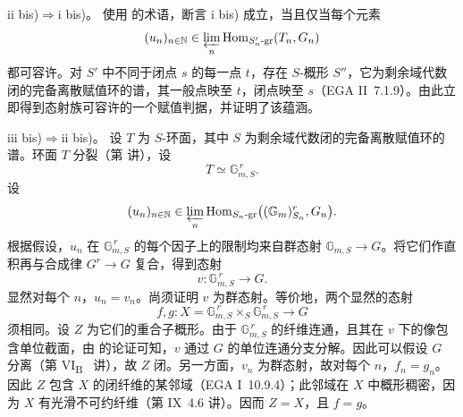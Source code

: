 \textup{ii bis)}\(\Rightarrow\)\textup{i bis)}。
使用  的术语，断言 \textup{i bis)} 成立，当且仅当每个元素
\[
 (u_n)_{n\in\mathbb N}\in
 \varprojlim_n\operatorname{Hom}_{S'_n\text{-gr}}(T_n,G_n)
\]
都可容许。对 \(S'\) 中不同于闭点 \(s\) 的每一点 \(t\)，存在 \(S\)-概形 \(S''\)，它为剩余域代数闭的完备离散赋值环的谱，其一般点映至 \(t\)，闭点映至 \(s\)（EGA II~7.1.9）。由此立即得到态射族可容许的一个赋值判据，并证明了该蕴涵。

\textup{iii bis)}\(\Rightarrow\)\textup{ii bis)}。
设 \(T\) 为 \(S\)-环面，其中 \(S\) 为剩余域代数闭的完备离散赋值环的谱。环面 \(T\) 分裂（第  讲），设
\[
  T\simeq\mathbb G_{m,S}^{\,r}.
\]
设
\[
 (u_n)_{n\in\mathbb N}\in
 \varprojlim_n
 \operatorname{Hom}_{S_n\text{-gr}}
 \bigl((\mathbb G_m)^r_{S_n},G_n\bigr).
\]
根据假设，\(u_n\) 在 \(\mathbb G_{m,S}^{\,r}\) 的每个因子上的限制均来自群态射 \(\mathbb G_{m,S}\to G\)。将它们作直积再与合成律 \(G^r\to G\) 复合，得到态射
\[
  v:\mathbb G_{m,S}^{\,r}\longrightarrow G.
\]
显然对每个 \(n\)，\(u_n=v_n\)。尚须证明 \(v\) 为群态射。等价地，两个显然的态射
\[
 f,g:X=\mathbb G_{m,S}^{\,r}\times_S\mathbb G_{m,S}^{\,r}
 \longrightarrow G
\]
须相同。设 \(Z\) 为它们的重合子概形。由于 \(\mathbb G_{m,S}^{\,r}\) 的纤维连通，且其在 \(v\) 下的像包含单位截面，由 的论证可知，\(v\) 通过 \(G\) 的单位连通分支分解。因此可以假设 \(G\) 分离（第 VI\textsubscript{B}~ 讲），故 \(Z\) 闭。另一方面，\(v_n\) 为群态射，故对每个 \(n\)，\(f_n=g_n\)。因此 \(Z\) 包含 \(X\) 的闭纤维的某邻域（EGA I~10.9.4）；此邻域在 \(X\) 中概形稠密，因为 \(X\) 有光滑不可约纤维（第 IX~4.6 讲）。因而 \(Z=X\)，且 \(f=g\)。



